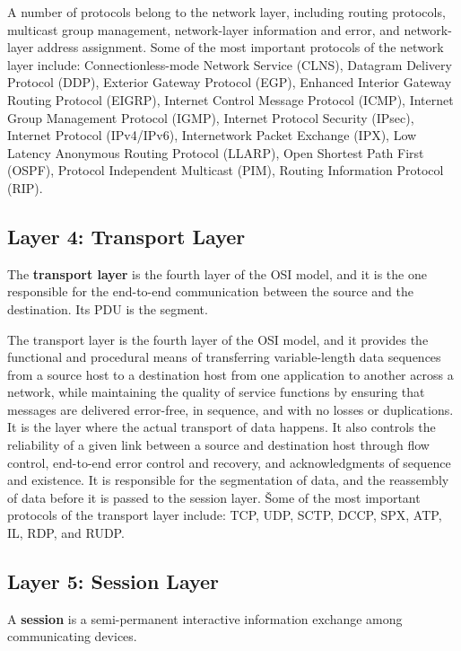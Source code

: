 A number of protocols belong to the network layer, including routing protocols, multicast group management,
network-layer information and error, and network-layer address assignment. Some of the most important protocols of the
network layer include: Connectionless-mode Network Service (CLNS), Datagram Delivery Protocol (DDP), Exterior Gateway
Protocol (EGP), Enhanced Interior Gateway Routing Protocol (EIGRP), Internet Control Message Protocol (ICMP),
Internet Group Management Protocol (IGMP), Internet Protocol Security (IPsec), Internet Protocol (IPv4/IPv6),
Internetwork Packet Exchange (IPX), Low Latency Anonymous Routing Protocol (LLARP), Open Shortest Path First (OSPF),
Protocol Independent Multicast (PIM), Routing Information Protocol (RIP).

\subsection{Layer 4: Transport Layer}

The \textbf{transport layer} is the fourth layer of the OSI model, and it is the one responsible for the end-to-end
communication between the source and the destination. Its PDU is the segment.
\ed

The transport layer is the fourth layer of the OSI model, and it provides the functional and procedural means of
transferring variable-length data sequences from a source host to a destination host from one application to another
across a network, while maintaining the quality of service functions by ensuring that messages are delivered error-free,
in sequence, and with no losses or duplications. It is the layer where the actual transport of data happens. It also
controls the reliability of a given link between a source and destination host through flow control, end-to-end error
control and recovery, and acknowledgments of sequence and existence. It is responsible for the segmentation of data,
and the reassembly of data before it is passed to the session layer. \v

Some of the most important protocols of the transport layer include: TCP, UDP, SCTP, DCCP, SPX, ATP, IL, RDP, and
RUDP\@.

\subsection{Layer 5: Session Layer}

\bd[Session]
A \textbf{session} is a semi-permanent interactive information exchange among communicating devices.
\ed

